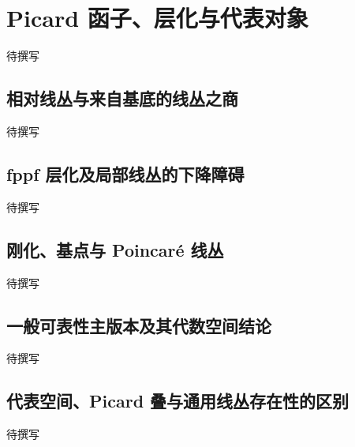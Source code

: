 
% 
% 
% 
% 

\section{Picard 函子、层化与代表对象}
\label{g5:sec:3304}

待撰写

\subsection{相对线丛与来自基底的线丛之商}
\label{g5:subsec:3304:01}
待撰写

\subsection{fppf 层化及局部线丛的下降障碍}
\label{g5:subsec:3304:02}
待撰写

\subsection{刚化、基点与 Poincaré 线丛}
\label{g5:subsec:3304:03}
待撰写

\subsection{一般可表性主版本及其代数空间结论}
\label{g5:subsec:3304:04}
待撰写

\subsection{代表空间、Picard 叠与通用线丛存在性的区别}
\label{g5:subsec:3304:05}
待撰写
